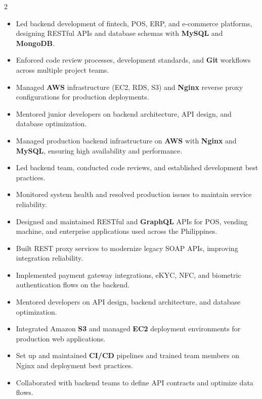\documentclass[10pt,a4paper,ragged2e,withhyper]{altacv}
\begin{document}
\begin{paracol}{2}
\begin{itemize}
    \item Led backend development of fintech, POS, ERP, and e-commerce platforms, designing RESTful APIs and database schemas with \textbf{MySQL} and \textbf{MongoDB}.
    \item Enforced code review processes, development standards, and \textbf{Git} workflows across multiple project teams.
    \item Managed \textbf{AWS} infrastructure (EC2, RDS, S3) and \textbf{Nginx} reverse proxy configurations for production deployments.
    \item Mentored junior developers on backend architecture, API design, and database optimization.
\divider
\end{itemize}

\begin{itemize}
    \item Managed production backend infrastructure on \textbf{AWS} with \textbf{Nginx} and \textbf{MySQL}, ensuring high availability and performance.
    \item Led backend team, conducted code reviews, and established development best practices.
    \item Monitored system health and resolved production issues to maintain service reliability.
\divider
\end{itemize}

\begin{itemize}
    \item Designed and maintained RESTful and \textbf{GraphQL} APIs for POS, vending machine, and enterprise applications used across the Philippines.
    \item Built REST proxy services to modernize legacy SOAP APIs, improving integration reliability.
    \item Implemented payment gateway integrations, eKYC, NFC, and biometric authentication flows on the backend.
    \item Mentored developers on API design, backend architecture, and database optimization.
\divider
\end{itemize}

\begin{itemize}
    \item Integrated Amazon \textbf{S3} and managed \textbf{EC2} deployment environments for production web applications.
    \item Set up and maintained \textbf{CI/CD} pipelines and trained team members on Nginx and deployment best practices.
    \item Collaborated with backend teams to define API contracts and optimize data flows.
\divider
\end{itemize}


\end{paracol}
\end{document}
